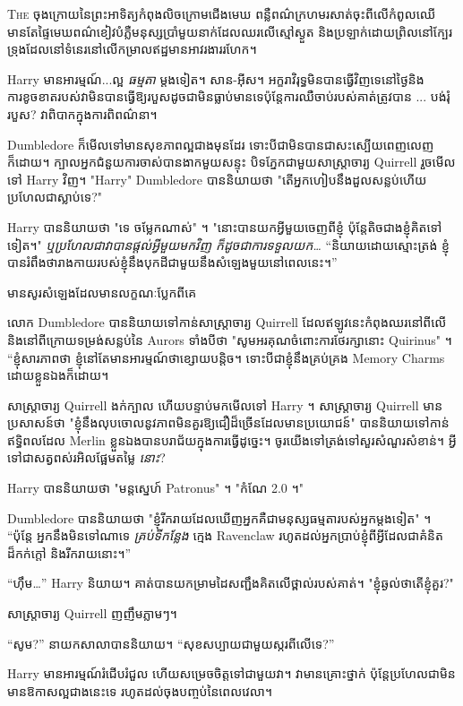 
\lettrine{T}{he} ចុង​ក្រោយ​នៃ​ព្រះអាទិត្យ​កំពុង​លិច​ក្រោម​ជើងមេឃ ពន្លឺ​ពណ៌​ក្រហម​រសាត់​ចុះ​ពី​លើ​កំពូល​ឈើ មាន​តែ​ផ្ទៃ​មេឃ​ពណ៌​ខៀវ​បំភ្លឺ​មនុស្ស​ប្រាំមួយ​នាក់​ដែល​ឈរ​លើ​ស្មៅ​ស្ងួត និង​ប្រឡាក់​ដោយ​ព្រិល​នៅ​ក្បែរ ទ្រុងដែលនៅទំនេរនៅលើកម្រាលឥដ្ឋមានអាវរងាររហែក។

Harry មានអារម្មណ៍...ល្អ \emph{ធម្មតា} ម្តងទៀត។ សាន-អ៊ីស។ អក្ខរាវិរុទ្ធមិនបានធ្វើវិញទេនៅថ្ងៃនិងការខូចខាតរបស់វាមិនបានធ្វើឱ្យរបួសដូចជាមិនធ្លាប់មានទេប៉ុន្តែការឈឺចាប់របស់គាត់ត្រូវបាន ... បង់រុំរបួស? វាពិបាកក្នុងការពិពណ៌នា។

Dumbledore ក៏មើលទៅមានសុខភាពល្អជាងមុនដែរ ទោះបីជាមិនបានជាសះស្បើយពេញលេញក៏ដោយ។ ក្បាល​អ្នក​ជំនួយការ​ចាស់​បាន​ងាក​មួយ​សន្ទុះ បិទ​ភ្នែក​ជាមួយ​សាស្ត្រាចារ្យ Quirrell រួច​មើល​ទៅ Harry វិញ។ "Harry" Dumbledore បាននិយាយថា "តើអ្នកហៀបនឹងដួលសន្លប់ហើយប្រហែលជាស្លាប់ទេ?"

Harry បាននិយាយថា "ទេ ចម្លែកណាស់" ។ "នោះបានយកអ្វីមួយចេញពីខ្ញុំ ប៉ុន្តែតិចជាងខ្ញុំគិតទៅទៀត។" \emph{ឬប្រហែលជាវាបានផ្ដល់អ្វីមួយមកវិញ ក៏ដូចជាការទទួលយក…} “និយាយដោយស្មោះត្រង់ ខ្ញុំបានរំពឹងថារាងកាយរបស់ខ្ញុំនឹងបុកដីជាមួយនឹងសំឡេងមួយនៅពេលនេះ។”

មាន​សូរ​សំឡេង​ដែល​មាន​លក្ខណៈ​ប្លែក​ពី​គេ

លោក Dumbledore បាននិយាយទៅកាន់សាស្រ្តាចារ្យ Quirrell ដែលឥឡូវនេះកំពុងឈរនៅពីលើ និងនៅពីក្រោយទម្រង់សន្លប់នៃ Aurors ទាំងបីថា "សូមអរគុណចំពោះការថែរក្សានោះ Quirinus" ។ “ខ្ញុំ​សារភាព​ថា ខ្ញុំ​នៅ​តែ​មាន​អារម្មណ៍​ថា​ខ្សោយ​បន្តិច។ ទោះបីជាខ្ញុំនឹងគ្រប់គ្រង Memory Charms ដោយខ្លួនឯងក៏ដោយ។

សាស្ត្រាចារ្យ Quirrell ងក់ក្បាល ហើយបន្ទាប់មកមើលទៅ Harry ។ សាស្ត្រាចារ្យ Quirrell មានប្រសាសន៍ថា "ខ្ញុំនឹងលុបចោលនូវភាពមិនគួរឱ្យជឿដ៏ច្រើនដែលមានប្រយោជន៍" បាននិយាយទៅកាន់ឥទ្ធិពលដែល Merlin ខ្លួនឯងបានបរាជ័យក្នុងការធ្វើដូច្នេះ។ ចូរយើងទៅត្រង់ទៅសួរសំណួរសំខាន់។ អ្វី​ទៅ​ជា​សត្វ​ពស់​រអិល​ផ្អែម​តម្លៃ \emph{នោះ}?

Harry បាននិយាយថា "មន្តស្នេហ៍ Patronus" ។ "កំណែ 2.0 ។"

Dumbledore បាននិយាយថា "ខ្ញុំរីករាយដែលឃើញអ្នកគឺជាមនុស្សធម្មតារបស់អ្នកម្តងទៀត" ។ “ប៉ុន្តែ អ្នកនឹងមិនទៅណាទេ \emph{គ្រប់ទីកន្លែង} ក្មេង Ravenclaw រហូតដល់អ្នកប្រាប់ខ្ញុំពីអ្វីដែលជាគំនិតដ៏កក់ក្តៅ និងរីករាយនោះ។”

“ហ៊ឹម…” Harry និយាយ។ គាត់បានយកម្រាមដៃសញ្ជឹងគិតលើថ្ពាល់របស់គាត់។ "ខ្ញុំឆ្ងល់ថាតើខ្ញុំគួរ?"

សាស្រ្តាចារ្យ Quirrell ញញឹមភ្លាមៗ។

“សូម?” នាយកសាលាបាននិយាយ។ “សុខសប្បាយជាមួយស្ករពីលើទេ?”

Harry មានអារម្មណ៍រំជើបរំជួល ហើយសម្រេចចិត្តទៅជាមួយវា។ វាមានគ្រោះថ្នាក់ ប៉ុន្តែប្រហែលជាមិនមានឱកាសល្អជាងនេះទេ រហូតដល់ចុងបញ្ចប់នៃពេលវេលា។

